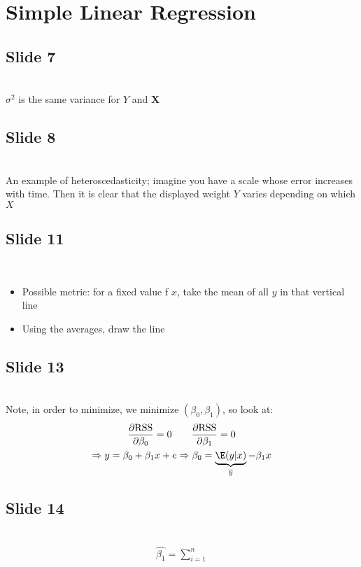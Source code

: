 \section{Simple Linear Regression}
\subsection{Slide 7}\hfill\\
\noindent$\sigma^2$ is the same variance for $Y$ and $\mathbf{X}$
\par\bigskip
\subsection{Slide 8}\hfill\\
\noindent An example of heteroscedasticity; imagine you have a scale whose error increases with time. Then it is clear that the displayed weight $Y$ varies depending on which $X$
\par\bigskip
\subsection{Slide 11}\hfill\\
\begin{itemize}
  \item Possible metric: for a fixed value f $x$, take the mean of all $y$ in that vertical line
  \item Using the averages, draw the line
\end{itemize}
\par\bigskip
\subsection{Slide 13}\hfill\\
\noindent Note, in order to minimize, we minimize $(\beta_0,\beta_1)$, so look at:
\begin{equation*}
  \begin{gathered}
    \dfrac{\partial \text{RSS}}{\partial \beta_0} = 0\qquad \dfrac{\partial \text{RSS}}{\partial \beta_1} = 0\\
    \Rightarrow y = \beta_0+\beta_1x+e\Rightarrow \beta_0 = \underbrace{\E(y|x)}_{\overline{y}}-\beta_1x
  \end{gathered}
\end{equation*}
\par\bigskip
\subsection{Slide 14}\hfill\\
\begin{equation*}
  \begin{gathered}
    \widehat{\beta_1} = \sum_{i=1}^{n}
  \end{gathered}
\end{equation*}
